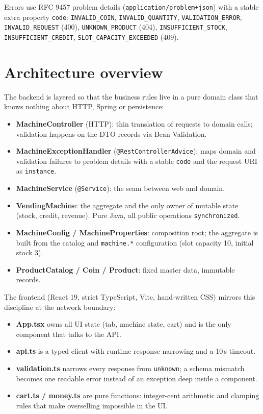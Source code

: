 \documentclass[11pt,a4paper]{article}
\newcommand{\code}[1]{\texttt{\small #1}}
\begin{document}
Errors use RFC 9457 problem details (\code{application/problem+json}) with a
stable extra property \code{code}: \code{INVALID\_COIN},
\code{INVALID\_QUANTITY}, \code{VALIDATION\_ERROR}, \code{INVALID\_REQUEST}
(400), \code{UNKNOWN\_PRODUCT} (404), \code{INSUFFICIENT\_STOCK},
\code{INSUFFICIENT\_CREDIT}, \code{SLOT\_CAPACITY\_EXCEEDED} (409).

\section{Architecture overview}

The backend is layered so that the business rules live in a pure domain class
that knows nothing about HTTP, Spring or persistence:

\begin{itemize}[itemsep=2pt]
  \item \textbf{MachineController} (HTTP): thin translation of requests to domain calls; validation happens on the DTO records via Bean Validation.
  \item \textbf{MachineExceptionHandler} (\code{@RestControllerAdvice}): maps domain and validation failures to problem details with a stable \code{code} and the request URI as \code{instance}.
  \item \textbf{MachineService} (\code{@Service}): the seam between web and domain.
  \item \textbf{VendingMachine}: the aggregate and the only owner of mutable state (stock, credit, revenue). Pure Java, all public operations \code{synchronized}.
  \item \textbf{MachineConfig / MachineProperties}: composition root; the aggregate is built from the catalog and \code{machine.*} configuration (slot capacity 10, initial stock 3).
  \item \textbf{ProductCatalog / Coin / Product}: fixed master data, immutable records.
\end{itemize}

The frontend (React 19, strict TypeScript, Vite, hand-written CSS) mirrors this
discipline at the network boundary:

\begin{itemize}[itemsep=2pt]
  \item \textbf{App.tsx} owns all UI state (tab, machine state, cart) and is the only component that talks to the API.
  \item \textbf{api.ts} is a typed client with runtime response narrowing and a 10\,s timeout.
  \item \textbf{validation.ts} narrows every response from \code{unknown}; a schema mismatch becomes one readable error instead of an exception deep inside a component.
  \item \textbf{cart.ts / money.ts} are pure functions: integer-cent arithmetic and clamping rules that make overselling impossible in the UI.
\end{itemize}
\end{document}
